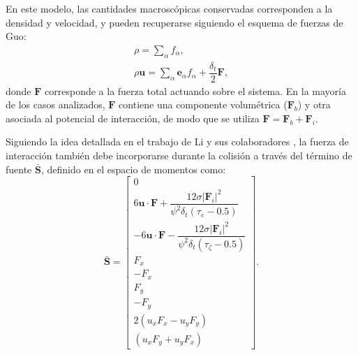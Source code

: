 En este modelo, las cantidades macrosc\'opicas conservadas corresponden a la densidad y velocidad, y pueden recuperarse siguiendo el esquema de fuerzas de Guo:
\begin{equation}
	\begin{gathered}
		\rho = \sum_{\alpha} f_{\alpha}, \\
		\rho \bm{u} = \sum_{\alpha} \bm{e}_{\alpha} f_{\alpha} + \dfrac{\delta_t}{2} \bm{F},
	\end{gathered}
\end{equation}
donde $\bm{F}$ corresponde a la fuerza total actuando sobre el sistema. En la mayor\'ia de los casos analizados, $\bm{F}$ contiene una componente volum\'etrica ($\bm{F}_b$) y otra asociada al potencial de interacci\'on, de modo que se utiliza $\bm{F} = \bm{F}_b + \bm{F}_i$.

Siguiendo la idea detallada en el trabajo de Li y sus colaboradores \cite{li_forcing_2012}, la fuerza de interacci\'on tambi\'en debe incorporarse durante la colisi\'on a trav\'es del t\'ermino de fuente $\bar{\bm{S}}$, definido en el espacio de momentos como:
\begin{equation}
 \bar{\bm{S}} = 
 \left[ 
 	\begin{array}{c} 
 		0	\\
 		6 \bm{u} \cdot \bm{F} + \dfrac{12\sigma |\bm{F}_i|^2}{\psi^2 \delta_t (\tau_e-0.5)} \\
 		-6 \bm{u} \cdot \bm{F} - \dfrac{12\sigma |\bm{F}_i|^2}{\psi^2 \delta_t (\tau_{\zeta}-0.5)} \\
 		F_x \\
 		-F_x \\
 		F_y \\
 		-F_y \\
 		2(u_xF_x - u_yF_y) \\
 		(u_xF_y + u_yF_x)
 	\end{array} 
 \right].
 \label{eq:s_li}
\end{equation}

